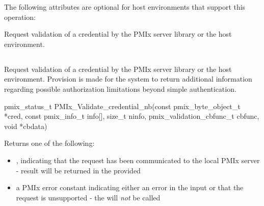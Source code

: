 
\reqattrend

\optattrstart
The following attributes are optional for host environments that support this operation:


\optattrend

\descr

Request validation of a credential by the \ac{PMIx} server library or the host environment.


\subsection{}

\summary

Request validation of a credential by the \ac{PMIx} server library or the host environment. Provision is made for the system to return additional information regarding possible authorization limitations beyond simple authentication.


\format

\cspecificstart
\begin{codepar}
pmix_status_t
PMIx_Validate_credential_nb(const pmix_byte_object_t *cred,
                            const pmix_info_t info[], size_t ninfo,
                            pmix_validation_cbfunc_t cbfunc,
                            void *cbdata)
\end{codepar}
\cspecificend

\begin{arglist}
\end{arglist}

Returns one of the following:

\begin{itemize}
    \item {}, indicating that the request has been communicated to the local \ac{PMIx} server - result will be returned in the provided 
    \item a \ac{PMIx} error constant indicating either an error in the input or that the request is unsupported - the  will \textit{not} be called
\end{itemize}

